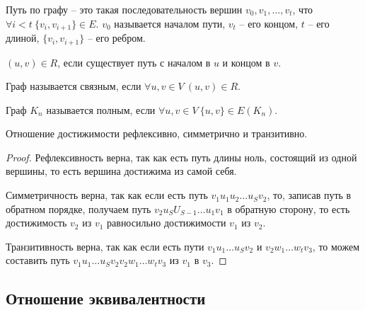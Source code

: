 \documentclass[12pt]{article}
\begin{document}
\begin{definition}
	Путь по графу -- это такая последовательность вершин $v_0,
	v_1,\ldots, v_t$, что $\forall i<t\ \{v_i,v_{i+1}\}\in E$. $v_0$
	называется началом пути, $v_t$ -- его концом, $t$ -- его длиной,
	$\{v_i,v_{i+1}\}$ -- его ребром.
\end{definition}
\begin{definition}
	$(u, v)\in R$, если существует путь с началом в $u$ и концом в $v$.
\end{definition}
\begin{definition}
	Граф называется связным, если $\forall u, v\in V\ (u, v)\in R$.
\end{definition}
\begin{definition}
	Граф $K_n$ называется полным, если $\forall u,v\in V\ \{u,v\}\in E(K_n)$.
\end{definition}
\begin{lemma}
	Отношение достижимости рефлексивно, симметрично и транзитивно.
	\begin{proof}
		Рефлексивность верна, так как есть путь длины ноль, состоящий из
		одной вершины, то есть вершина достижима из самой себя.\par

		Симметричность верна, так как если есть путь $v_1u_1u_2\ldots
		u_Sv_2$, то, записав путь в обратном порядке, получаем путь
		$v_2u_SU_{S-1}\ldots u_1v_1$ в обратную сторону, то есть
		достижимость $v_2$ из $v_1$ равносильно достижимости $v_1$ из $v_2$.\par

		Транзитивность верна, так как если есть пути $v_1u_1\ldots u_Sv_2$
		и $v_2w_1\ldots w_tv_3$, то можем составить путь $v_1u_1\ldots
		u_Sv_2v_2w_1\ldots w_tv_3$ из $v_1$ в $v_3$.
	\end{proof}
\end{lemma}

\subsection{Отношение эквивалентности}
\end{document}
